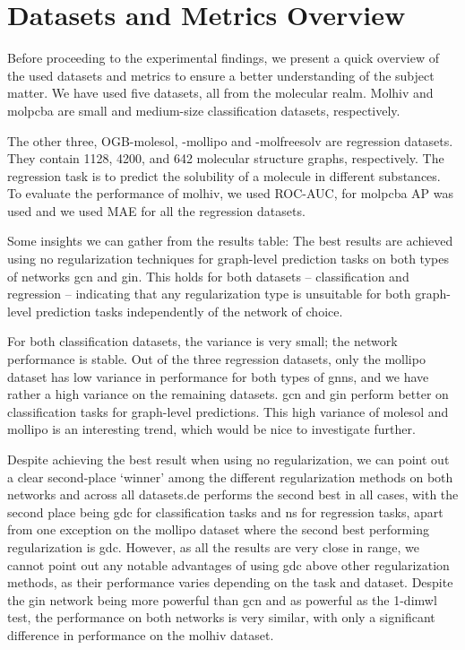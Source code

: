 \section{Datasets and Metrics Overview}

Before proceeding to the experimental findings, we present a quick overview of the used datasets and metrics to ensure a better understanding of the subject matter. We have used five datasets, all from the molecular realm. Molhiv and molpcba are small and medium-size classification datasets, respectively.

The other three, OGB-molesol, -mollipo and -molfreesolv are regression datasets. They contain 1128, 4200, and 642
molecular structure graphs, respectively. The regression task is to predict the solubility
of a molecule in different substances.
To evaluate the performance of molhiv, we used ROC-AUC, for molpcba AP was used and we used MAE for all the regression datasets.

Some insights we can gather from the results table:
The best results are achieved using no regularization techniques for graph-level prediction tasks on both types of networks \ac{gcn} and \ac{gin}. This holds for both datasets -- classification and regression -- indicating that any regularization type is unsuitable for both graph-level prediction tasks independently of the network of choice.

For both classification datasets, the variance is very small; the network performance is stable. Out of the three regression datasets, only the mollipo dataset has low variance in performance for both types of \acp{gnn}, and we have rather a high variance on the remaining datasets. \ac{gcn} and \ac{gin} perform better on classification tasks for graph-level predictions. This high variance of molesol and mollipo is an interesting trend, which would be nice to investigate further.

Despite achieving the best result when using no regularization, we can point out a clear second-place `winner' among the different regularization methods on both networks and across all datasets.\ac{de} performs the second best in all cases, with the second place being \ac{gdc} for classification tasks and \ac{ns} for regression tasks, apart from one exception on the mollipo dataset where the second best performing regularization is \ac{gdc}. However, as all the results are very close in range, we cannot point out any notable advantages of using \ac{gdc} above other regularization methods, as their performance varies depending on the task and dataset.
Despite the \ac{gin} network being more powerful than \ac{gcn} and as powerful as the 1-dim\ac{wl} test, the performance on both networks is very similar, with only a significant difference in performance on the molhiv dataset.

